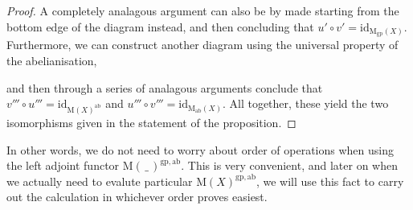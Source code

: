 \begin{proof}
A completely analagous argument can also be by made starting from the bottom edge of the diagram instead, and then concluding that $u' \circ v' = \mathrm{id}_{\mathrm{M}_{\mathrm{gp}}(X)}$. Furthermore, we can construct another diagram using the universal property of the abelianisation,
\begin{eq*}  \end{eq*}
and then through a series of analagous arguments conclude that $v''' \circ u''' = \mathrm{id}_{\mathrm{M}(X)^{\mathrm{ab}}}$ and $u''' \circ v''' = \mathrm{id}_{\mathrm{M}_{\mathrm{ab}}(X)}$. All together, these yield the two isomorphisms given in the statement of the proposition.
\end{proof}

In other words, we do not need to worry about order of operations when using the left adjoint functor $\mathrm{M}(\, \_ \,)^{\mathrm{gp},\mathrm{ab}}$. This is very convenient, and later on when we actually need to evalute particular $\mathrm{M}(X)^{\mathrm{gp},\mathrm{ab}}$, we will use this fact to carry out the calculation in whichever order proves easiest.